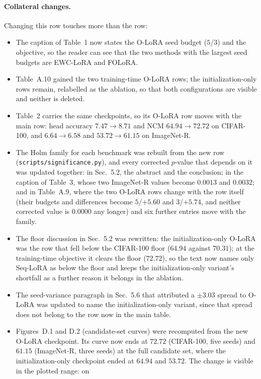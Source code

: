 \paragraph{Collateral changes.} Changing this row touches more than the row:
\begin{itemize}
\item The caption of Table~1 now states the O-LoRA seed budget ($5$/$3$) and the
  objective, so the reader can see that the two methods with the largest seed budgets are
  EWC-LoRA and FOLoRA.
\item Table~A.10 gained the two training-time O-LoRA rows; the
  initialization-only rows remain, relabelled as the ablation, so that both configurations
  are visible and neither is deleted.
\item Table~2 carries the same checkpoints, so its O-LoRA row moves with the main row: head
  accuracy $7.47\to8.71$ and NCM $64.94\to72.72$ on CIFAR-100, and $6.64\to6.58$ and
  $53.72\to61.15$ on ImageNet-R.
\item The Holm family for each benchmark was rebuilt from the new row
  (\texttt{scripts/significance.py}), and every corrected $p$-value that depends on it was
  updated together: in Sec.~5.2, the abstract and the conclusion; in the caption of
  Table~3, whose two ImageNet-R values become $0.0013$ and $0.0032$; and in Table~A.9,
  where the two O-LoRA rows change with the row itself (their budgets and differences
  become $5$/$+5.60$ and $3$/$+5.74$, and neither corrected value is $0.0000$ any longer)
  and six further entries move with the family.
\item The floor discussion in Sec.~5.2 was rewritten: the
  initialization-only O-LoRA was the row that fell below the CIFAR-100 floor ($64.94$ against
  $70.31$); at the training-time objective it clears the floor ($72.72$), so the text now
  names only Seq-LoRA as below the floor and keeps the initialization-only variant's shortfall
  as a further reason it belongs in the ablation.
\item The seed-variance paragraph in Sec.~5.6 that attributed a
  $\pm3.03$ spread to O-LoRA was updated to name the initialization-only variant, since that
  spread does not belong to the row now in the main table.
\item Figures~D.1 and D.2 (candidate-set curves) were recomputed from the new O-LoRA
  checkpoint. Its curve now ends at $72.72$ (CIFAR-100, five seeds) and $61.15$
  (ImageNet-R, three seeds) at the full candidate set, where the initialization-only
  checkpoint ended at $64.94$ and $53.72$. The change is visible in the plotted range: on

\end{itemize}
